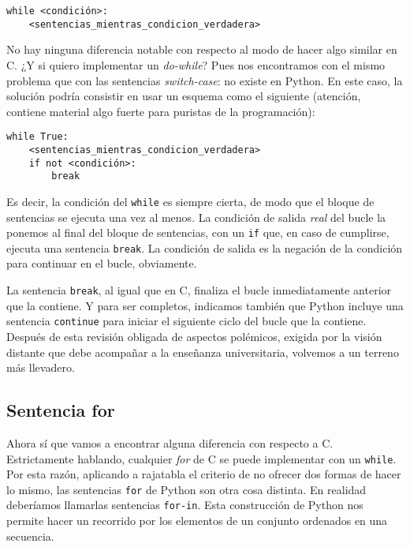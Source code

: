 \begin{lstlisting}
while <condición>:
    <sentencias_mientras_condicion_verdadera>
\end{lstlisting}

No hay ninguna diferencia notable con respecto al modo de hacer algo similar en C. ¿Y si quiero implementar un \emph{do-while}? Pues nos encontramos con el mismo problema que con las sentencias \emph{switch-case}: no existe en Python. En este caso, la solución podría consistir en usar un esquema como el siguiente (atención, contiene material algo fuerte para puristas de la programación):

\begin{lstlisting}
while True:
    <sentencias_mientras_condicion_verdadera>
    if not <condición>:
        break
\end{lstlisting}

Es decir, la condición del \texttt{while} es siempre cierta, de modo que el bloque de sentencias se ejecuta una vez al menos. La condición de salida \emph{real} del bucle la ponemos al final del bloque de sentencias, con un \texttt{if} que, en caso de cumplirse, ejecuta una sentencia \texttt{break}. La condición de salida es la negación de la condición para continuar en el bucle, obviamente.

La sentencia \texttt{break}, al igual que en C, finaliza el bucle inmediatamente anterior que la contiene. Y para ser completos, indicamos también que Python incluye una sentencia \texttt{continue} para iniciar el siguiente ciclo del bucle que la contiene. Después de esta revisión obligada de aspectos polémicos, exigida por la visión distante que debe acompañar a la enseñanza universitaria, volvemos a un terreno más llevadero.

\subsection{Sentencia for}\label{sec:sentenciaFor}

Ahora sí que vamos a encontrar alguna diferencia con respecto a C. Estrictamente hablando, cualquier \emph{for} de C se puede implementar con un \texttt{while}. Por esta razón, aplicando a rajatabla el criterio de no ofrecer dos formas de hacer lo mismo, las sentencias \texttt{for} de Python son otra cosa distinta. En realidad deberíamos llamarlas sentencias \texttt{for-in}. Esta construcción de Python nos permite hacer un recorrido por los elementos de un conjunto ordenados en una secuencia. 

